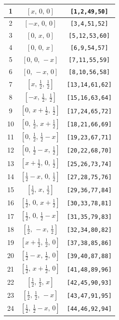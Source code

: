 \documentclass[fleqn,8pt]{jsarticle}
\begin{document}
\begin{longtable}{ccc}
1 & $\left[ x,\, 0,\, 0 \right]$ & {\tt [1,2,49,50]} \\ \hline
2 & $\left[ - x,\, 0,\, 0 \right]$ & {\tt [3,4,51,52]} \\ \hline
3 & $\left[ 0,\, x,\, 0 \right]$ & {\tt [5,12,53,60]} \\ \hline
4 & $\left[ 0,\, 0,\, x \right]$ & {\tt [6,9,54,57]} \\ \hline
5 & $\left[ 0,\, 0,\, - x \right]$ & {\tt [7,11,55,59]} \\ \hline
6 & $\left[ 0,\, - x,\, 0 \right]$ & {\tt [8,10,56,58]} \\ \hline
7 & $\left[ x,\, \frac{1}{2},\, \frac{1}{2} \right]$ & {\tt [13,14,61,62]} \\ \hline
8 & $\left[ - x,\, \frac{1}{2},\, \frac{1}{2} \right]$ & {\tt [15,16,63,64]} \\ \hline
9 & $\left[ 0,\, x + \frac{1}{2},\, \frac{1}{2} \right]$ & {\tt [17,24,65,72]} \\ \hline
10 & $\left[ 0,\, \frac{1}{2},\, x + \frac{1}{2} \right]$ & {\tt [18,21,66,69]} \\ \hline
11 & $\left[ 0,\, \frac{1}{2},\, \frac{1}{2} - x \right]$ & {\tt [19,23,67,71]} \\ \hline
12 & $\left[ 0,\, \frac{1}{2} - x,\, \frac{1}{2} \right]$ & {\tt [20,22,68,70]} \\ \hline
13 & $\left[ x + \frac{1}{2},\, 0,\, \frac{1}{2} \right]$ & {\tt [25,26,73,74]} \\ \hline
14 & $\left[ \frac{1}{2} - x,\, 0,\, \frac{1}{2} \right]$ & {\tt [27,28,75,76]} \\ \hline
15 & $\left[ \frac{1}{2},\, x,\, \frac{1}{2} \right]$ & {\tt [29,36,77,84]} \\ \hline
16 & $\left[ \frac{1}{2},\, 0,\, x + \frac{1}{2} \right]$ & {\tt [30,33,78,81]} \\ \hline
17 & $\left[ \frac{1}{2},\, 0,\, \frac{1}{2} - x \right]$ & {\tt [31,35,79,83]} \\ \hline
18 & $\left[ \frac{1}{2},\, - x,\, \frac{1}{2} \right]$ & {\tt [32,34,80,82]} \\ \hline
19 & $\left[ x + \frac{1}{2},\, \frac{1}{2},\, 0 \right]$ & {\tt [37,38,85,86]} \\ \hline
20 & $\left[ \frac{1}{2} - x,\, \frac{1}{2},\, 0 \right]$ & {\tt [39,40,87,88]} \\ \hline
21 & $\left[ \frac{1}{2},\, x + \frac{1}{2},\, 0 \right]$ & {\tt [41,48,89,96]} \\ \hline
22 & $\left[ \frac{1}{2},\, \frac{1}{2},\, x \right]$ & {\tt [42,45,90,93]} \\ \hline
23 & $\left[ \frac{1}{2},\, \frac{1}{2},\, - x \right]$ & {\tt [43,47,91,95]} \\ \hline
24 & $\left[ \frac{1}{2},\, \frac{1}{2} - x,\, 0 \right]$ & {\tt [44,46,92,94]} \\
\end{longtable}
\end{document}
